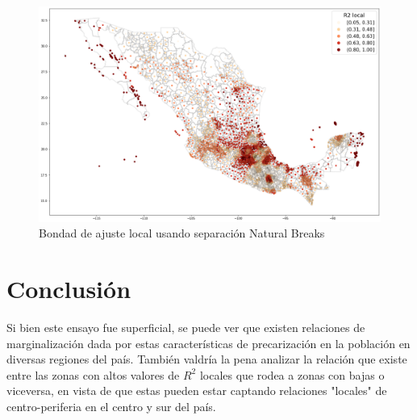 \documentclass[12pt,letterpaper]{article}
\begin{document}
\begin{figure}[H]
	\centering
	\includegraphics[scale=0.4]{output_19_1.png}
	\caption{Bondad de ajuste local usando separación Natural Breaks}
\end{figure}





\section{Conclusión}

Si bien este ensayo fue superficial, se puede ver que existen relaciones de marginalización dada por estas características de precarización en la población en diversas regiones del país. También valdría la pena analizar la relación que existe entre las zonas con altos valores de $R^2$ locales que rodea a zonas con bajas o viceversa, en vista de que estas pueden estar captando relaciones "locales" de centro-periferia en el centro y sur del país.
\end{document}
